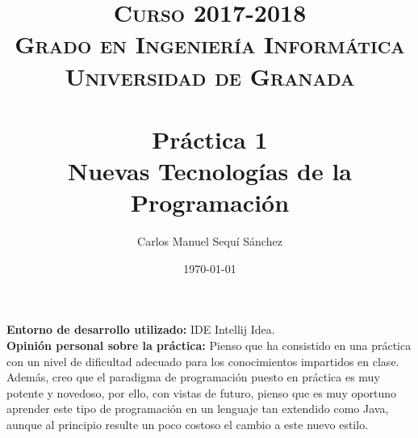 


\title{	
\normalfont \normalsize 
\textsc{\textbf{Curso 2017-2018} \\ Grado en Ingeniería Informática \\ Universidad de Granada} \\ [25pt] %
\horrule{0.5pt} \\[0.4cm] %
\huge Práctica 1 \\ Nuevas Tecnologías de la Programación %
\horrule{2pt} \\[0.5cm] %
}

\author{Carlos Manuel Sequí Sánchez} %

\date{\normalsize\today} %




\maketitle %
\textbf{Entorno de desarrollo utilizado:} IDE Intellij Idea.\\
\textbf{Opinión personal sobre la práctica:} Pienso que ha consistido en una práctica con un nivel de dificultad adecuado para los conocimientos impartidos en clase. Además, creo que el paradigma de programación puesto en práctica es muy potente y novedoso, por ello, con vistas de futuro, pienso que es muy oportuno aprender este tipo de programación en un lenguaje tan extendido como Java, aunque al principio resulte un poco costoso el cambio a este nuevo estilo.




